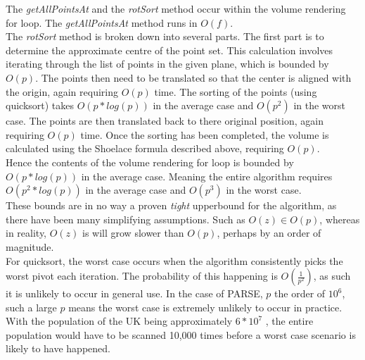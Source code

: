The \textit{getAllPointsAt} and the \textit{rotSort} method occur within the volume rendering for loop. The  \textit{getAllPointsAt} method runs in  $O(f)$.\\

The \textit{rotSort} method is broken down into several parts. The first part is to determine the approximate centre of the point set. This calculation involves iterating through the list of points in the given plane, which is bounded by $O(p)$. The points then need to be translated so that the center is aligned with the origin, again requiring $O(p)$ time. The sorting of the points (using quicksort) takes $O(p * log(p))$ in the average case and $O(p^2)$ in the worst case. The points are then translated back to there original position, again requiring $O(p)$ time. Once the sorting has been completed, the volume is calculated using the Shoelace formula described above, requiring $O(p)$.\\

Hence the contents of the volume rendering for loop is bounded by $O(p * log(p))$ in the average case. Meaning the entire algorithm requires $O(p^2 * log(p))$ in the average case and $O(p^3)$ in the worst case. \\

These bounds are in no way a proven \textit{tight} upperbound for the algorithm, as there have been many simplifying assumptions. Such as $O(z) \in O(p)$, whereas in reality, $O(z)$ is will grow slower than $O(p)$, perhaps by an order of magnitude.\\

For quicksort, the worst case occurs when the algorithm consistently picks the worst pivot each iteration. The probability of this happening is $O(\frac{1}{p^2})$, as such it is unlikely to occur in general use. In the case of PARSE, $p$ the order of $10^6$, such a large $p$ means the worst case is extremely unlikely to occur in practice. With the population of the UK being approximately $6 * 10^7$ \cite{UnitedKingdomofGreatBritain2011}, the entire population would have to be scanned 10,000 times before a worst case scenario is likely to have happened.